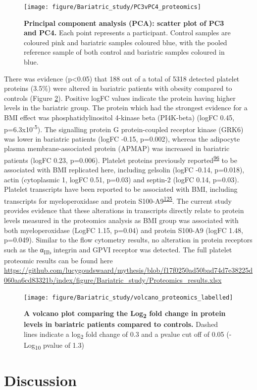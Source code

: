 \documentclass[11pt,twoside]{bristolthesis}
\begin{document}
\begin{figure}
\texttt{[image: figure/Bariatric\_study/PC3vPC4\_proteomics]} \caption[Principal component analysis (PCA): scatter plot of PC3 and PC4.]{\textbf{Principal component analysis (PCA): scatter plot of PC3 and PC4.} Each point represents a participant. Control samples are coloured pink and bariatric samples coloured blue, with the pooled reference sample of both control and bariatric samples coloured in blue.}\label{fig:pca2}
\end{figure}
There was evidence (p\textless0.05) that 188 out of a total of 5318 detected platelet proteins (3.5\%) were altered in bariatric patients with obesity compared to controls (Figure \ref{fig:volcano}). Positive logFC values indicate the protein having higher levels in the bariatric group. The protein which had the strongest evidence for a BMI effect was phosphatidylinositol 4-kinase beta (PI4K-beta) (logFC 0.45, p=6.3x10\textsuperscript{-5}). The signalling protein G protein-coupled receptor kinase (GRK6) was lower in bariatric patients (logFC -0.15, p=0.002), whereas the adipocyte plasma membrane-associated protein (APMAP) was increased in bariatric patients (logFC 0.23, p=0.006). Platelet proteins previously reported\textsuperscript{\protect\hyperlink{ref-Barrachina2019}{96}} to be associated with BMI replicated here, including gelsolin (logFC -0.14, p=0.018), actin (cytoplasmic 1, logFC 0.51, p=0.03) and septin-2 (logFC 0.14, p=0.03). Platelet transcripts have been reported to be associated with BMI, including transcripts for myeloperoxidase and protein S100-A9\textsuperscript{\protect\hyperlink{ref-Freedman2010}{125}}. The current study provides evidence that these alterations in transcripts directly relate to protein levels measured in the proteomics analysis as BMI group was associated with both myeloperoxidase (LogFC 1.15, p=0.04) and protein S100-A9 (logFC 1.48, p=0.049). Similar to the flow cytometry results, no alteration in protein receptors such as the α\textsubscript{IIb} integrin and GPVI receptor was detected. The full platelet proteomic results can be found here \url{https://github.com/lucygoudswaard/mythesis/blob/f17f0250ad50bad74d7e38225d060aa6cd83321b/index/figure/Bariatric_study/Proteomics_results.xlsx}



\begin{figure}
\texttt{[image: figure/Bariatric\_study/volcano\_proteomics\_labelled]} \caption[A volcano plot comparing the Log\textsubscript{2} fold change in protein levels in bariatric patients compared to controls]{\textbf{A volcano plot comparing the Log\textsubscript{2} fold change in protein levels in bariatric patients compared to controls.} Dashed lines indicate a log\textsubscript{2} fold change of 0.3 and a pvalue cut off of 0.05 (-Log\textsubscript{10} pvalue of 1.3)}\label{fig:volcano}
\end{figure}
\hypertarget{discussion-1}{%
\section{Discussion}\label{discussion-1}}
\end{document}
